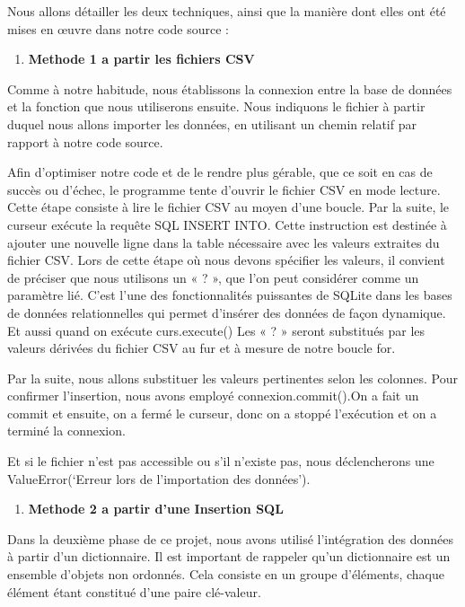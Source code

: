\documentclass[
]{article}
\providecommand{\tightlist}{%
  \setlength{\itemsep}{0pt}\setlength{\parskip}{0pt}}
\begin{document}
Nous allons détailler les deux techniques, ainsi que la manière dont
elles ont été mises en œuvre dans notre code source :

\begin{enumerate}
\def\labelenumi{\arabic{enumi}.}
\tightlist
\item
  \textbf{Methode 1 a partir les fichiers CSV}
\end{enumerate}

Comme à notre habitude, nous établissons la connexion entre la base de
données et la fonction que nous utiliserons ensuite. Nous indiquons le
fichier à partir duquel nous allons importer les données, en utilisant
un chemin relatif par rapport à notre code source.

Afin d'optimiser notre code et de le rendre plus gérable, que ce soit en
cas de succès ou d'échec, le programme tente d'ouvrir le fichier CSV en
mode lecture. Cette étape consiste à lire le fichier CSV au moyen d'une
boucle. Par la suite, le curseur exécute la requête SQL INSERT INTO.
Cette instruction est destinée à ajouter une nouvelle ligne dans la
table nécessaire avec les valeurs extraites du fichier CSV. Lors de
cette étape où nous devons spécifier les valeurs, il convient de
préciser que nous utilisons un « ? », que l'on peut considérer comme un
paramètre lié. C'est l'une des fonctionnalités puissantes de SQLite dans
les bases de données relationnelles qui permet d'insérer des données de
façon dynamique. Et aussi quand on exécute curs.execute() Les « ? »
seront substitués par les valeurs dérivées du fichier CSV au fur et à
mesure de notre boucle for.

Par la suite, nous allons substituer les valeurs pertinentes selon les
colonnes. Pour confirmer l'insertion, nous avons employé
connexion.commit().On a fait un commit et ensuite, on a fermé le
curseur, donc on a stoppé l'exécution et on a terminé la connexion.

Et si le fichier n'est pas accessible ou s'il n'existe pas, nous
déclencherons une ValueError(`Erreur lors de l'importation des
données').

\begin{enumerate}
\def\labelenumi{\arabic{enumi}.}
\setcounter{enumi}{1}
\tightlist
\item
  \textbf{Methode 2 a partir d'une Insertion SQL}
\end{enumerate}

Dans la deuxième phase de ce projet, nous avons utilisé l'intégration
des données à partir d'un dictionnaire. Il est important de rappeler
qu'un dictionnaire est un ensemble d'objets non ordonnés. Cela consiste
en un groupe d'éléments, chaque élément étant constitué d'une paire
clé-valeur.
\end{document}
